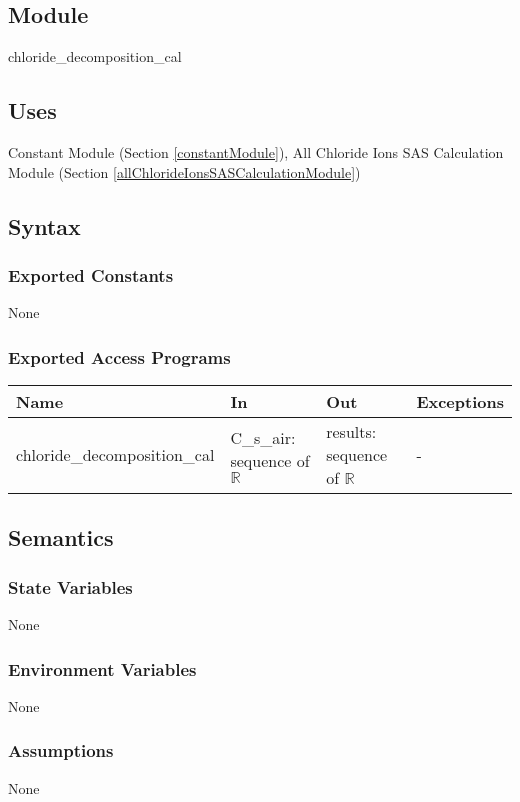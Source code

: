 \documentclass[12pt, titlepage]{article}
\begin{document}
\subsection{Module}
chloride\_decomposition\_cal

\subsection{Uses}

Constant Module (Section \ref{constantModule}), All Chloride Ions SAS Calculation Module (Section \ref{allChlorideIonsSASCalculationModule})

\subsection{Syntax}

\subsubsection{Exported Constants}
None
\subsubsection{Exported Access Programs}

\begin{center}
\begin{tabular}{p{4cm} p{4.5cm} p{4cm} p{2cm}}
\hline
\textbf{Name} & \textbf{In} & \textbf{Out} & \textbf{Exceptions} \\
\hline
chloride\_decomposition\_cal & C\_s\_air: sequence of $\mathbb{R}$ & results: sequence of $\mathbb{R}$ & - \\

\hline
\end{tabular}
\end{center}

\subsection{Semantics}

\subsubsection{State Variables}
None

\subsubsection{Environment Variables}
None
\subsubsection{Assumptions}
None
\end{document}
